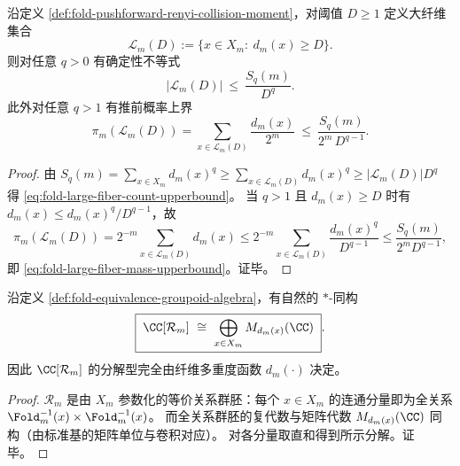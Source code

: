 \begin{proposition}[大纤维计数的纯矩上界]\label{prop:fold-large-fiber-moment-upperbounds}
沿定义 \ref{def:fold-pushforward-renyi-collision-moment}，对阈值 \(D\ge 1\) 定义大纤维集合
\[
\mathcal L_m(D):=\{x\in X_m:\ d_m(x)\ge D\}.
\]
则对任意 \(q>0\) 有确定性不等式
\begin{equation}\label{eq:fold-large-fiber-count-upperbound}
|\mathcal L_m(D)|\ \le\ \frac{S_q(m)}{D^q}.
\end{equation}
此外对任意 \(q>1\) 有推前概率上界
\begin{equation}\label{eq:fold-large-fiber-mass-upperbound}
\pi_m(\mathcal L_m(D))
=\sum_{x\in\mathcal L_m(D)}\frac{d_m(x)}{2^m}
\ \le\ \frac{S_q(m)}{2^m\,D^{q-1}}.
\end{equation}
\end{proposition}
\begin{proof}
由 \(S_q(m)=\sum_{x\in X_m}d_m(x)^q\ge \sum_{x\in\mathcal L_m(D)}d_m(x)^q\ge |\mathcal L_m(D)|D^q\) 得 \eqref{eq:fold-large-fiber-count-upperbound}。
当 \(q>1\) 且 \(d_m(x)\ge D\) 时有 \(d_m(x)\le d_m(x)^q/D^{q-1}\)，故
\[
\pi_m(\mathcal L_m(D))
=2^{-m}\sum_{x\in\mathcal L_m(D)}d_m(x)
\le 2^{-m}\sum_{x\in\mathcal L_m(D)}\frac{d_m(x)^q}{D^{q-1}}
\le \frac{S_q(m)}{2^mD^{q-1}},
\]
即 \eqref{eq:fold-large-fiber-mass-upperbound}。证毕。
\end{proof}

\begin{proposition}\label{prop:fold-groupoid-wedderburn}
沿定义 \ref{def:fold-equivalence-groupoid-algebra}，有自然的 \(\ast\)-同构
\[
\boxed{\;
\CC[\mathcal{R}_m]\ \cong\ \bigoplus_{x\in X_m} M_{d_m(x)}(\CC)\; }.
\]
因此 \(\CC[\mathcal{R}_m]\) 的分解型完全由纤维多重度函数 \(d_m(\cdot)\) 决定。
\end{proposition}
\begin{proof}
\(\mathcal{R}_m\) 是由 \(X_m\) 参数化的等价关系群胚：每个 \(x\in X_m\) 的连通分量即为全关系 \(\Fold_m^{-1}(x)\times\Fold_m^{-1}(x)\)。
而全关系群胚的复代数与矩阵代数 \(M_{d_m(x)}(\CC)\) 同构（由标准基的矩阵单位与卷积对应）。
对各分量取直和得到所示分解。证毕。
\end{proof}

